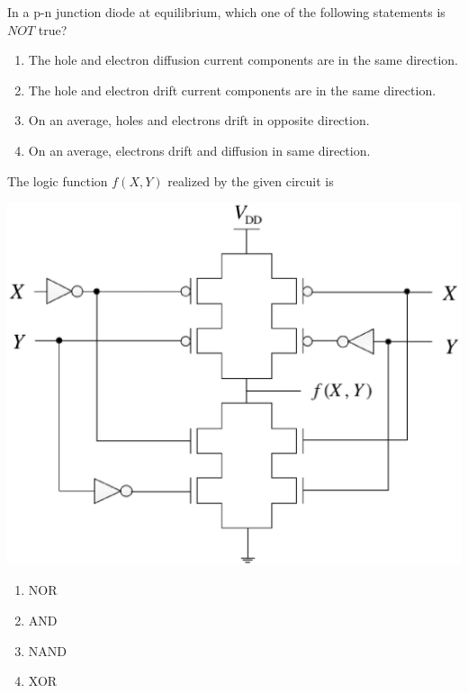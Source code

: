 \item In a p-n junction diode at equilibrium, which one of the following statements is $NOT$ true?
\begin{enumerate}
\item The hole and electron diffusion current components are in the same direction.
\item The hole and electron drift current components are in the same direction.
\item On an average, holes and electrons drift in opposite direction.
\item On an average, electrons drift and diffusion in same direction.
\end{enumerate}

\item The logic function $f(X, Y)$ realized by the given circuit is

\includegraphics[scale=0.35]{18}

\begin{enumerate}
\item NOR
\item AND
\item NAND
\item XOR
\end{enumerate}

